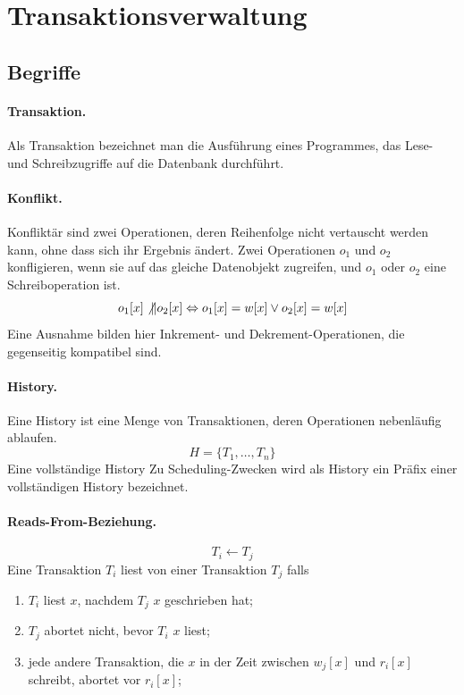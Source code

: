 \documentclass[]{scrartcl}
\begin{document}
\section{Transaktionsverwaltung}

\subsection{Begriffe}

\paragraph{Transaktion.} Als Transaktion bezeichnet man die Ausf\"uhrung eines Programmes, das Lese- und Schreibzugriffe auf die Datenbank durchf\"uhrt.

\paragraph{Konflikt.} Konflikt\"ar sind zwei Operationen, deren Reihenfolge nicht vertauscht werden kann, ohne dass sich ihr Ergebnis \"andert. Zwei Operationen $o_{1}$ und $o_{2}$ konfligieren, wenn sie auf das gleiche Datenobjekt zugreifen, und $o_1$ oder $o_2$ eine Schreiboperation ist. 
$$ o_{1}[x] \not \| o_{2}[x] \Leftrightarrow o_{1}[x] = w[x] \vee o_{2}[x] = w[x]$$
Eine Ausnahme bilden hier Inkrement- und Dekrement-Operationen, die gegenseitig kompatibel sind.


\paragraph{History.} Eine History ist eine Menge von Transaktionen, deren Operationen nebenl\"aufig ablaufen.
$$H = \{ T_{1}, \dots, T_{n} \}$$
Eine vollst\"andige History
Zu Scheduling-Zwecken wird als History ein Pr\"afix einer vollst\"andigen History bezeichnet.

\paragraph{Reads-From-Beziehung.}
$$T_{i} \gets T_{j}$$
Eine Transaktion $T_{i}$ liest von einer Transaktion $T_{j}$ falls
\begin{enumerate}
\item $T_{i}$ liest $x$, nachdem $T_{j}$ $x$ geschrieben hat;
\item $T_{j}$ abortet nicht, bevor $T_{i}$ $x$ liest;
\item jede andere Transaktion, die $x$ in der Zeit zwischen $w_{j}[x]$ und $r_{i}[x]$ schreibt, abortet vor $r_{i}[x]$;
\end{enumerate}
\end{document}
